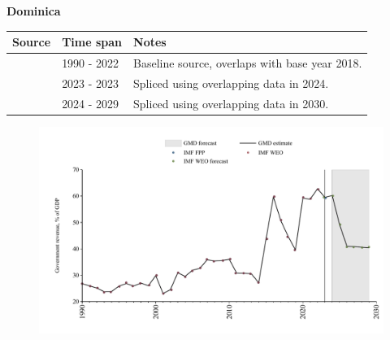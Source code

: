 \documentclass[12pt,a4paper,landscape]{article}
\begin{document}
\begin{adjustbox}{max totalsize={\paperwidth}{\paperheight},center}
\begin{minipage}[t][\textheight][t]{\textwidth}
\vspace*{0.5cm}
{}
\begin{center}
{\Large\bfseries Dominica}
\end{center}
\vspace{0.5cm}
\begin{table}[H]
\centering
\small
\begin{tabular}{|l|l|l|}
\hline
\textbf{Source} & \textbf{Time span} & \textbf{Notes} \\
\hline
\rowcolor{white}\cite{IMF_WEO}& 1990 - 2022 &Baseline source, overlaps with base year 2018.\\
\rowcolor{lightgray}\cite{IMF_FPP}& 2023 - 2023 &Spliced using overlapping data in 2024.\\
\rowcolor{white}\cite{IMF_WEO_forecast}& 2024 - 2029 &Spliced using overlapping data in 2030.\\
\hline
\end{tabular}
\end{table}
\begin{figure}[H]
\centering
\includegraphics[width=\textwidth,height=0.6\textheight,keepaspectratio]{graphs/DMA_govrev_GDP.pdf}
\end{figure}
\end{minipage}
\end{adjustbox}
\end{document}
